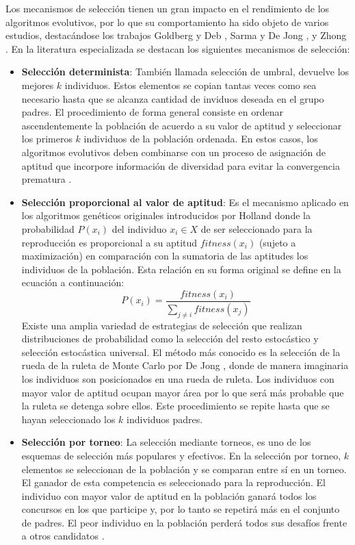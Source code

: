 Los mecanismos de selección tienen un gran impacto en el rendimiento de los algoritmos evolutivos, por lo que su comportamiento ha sido objeto de varios estudios, destacándose los trabajos Goldberg y Deb \cite{Goldberg91acomparative}, Sarma y De Jong \cite{sarma1997analysis} , y Zhong \cite{Zhong_comparisonof}. En la literatura especializada se destacan los siguientes mecanismos de selección:
\begin{itemize}
\item\textbf{Selección determinista}: También llamada selección de umbral, devuelve los mejores $k$ individuos. Estos elementos se copian tantas veces como sea necesario hasta que se alcanza cantidad de inviduos deseada  en el grupo padres. El procedimiento de forma general consiste en ordenar ascendentemente la población de acuerdo a su valor de aptitud y seleccionar los primeros $k$ individuos de la población ordenada. En estos casos, los algoritmos evolutivos deben combinarse con un proceso de asignación de aptitud que incorpore información de diversidad para evitar la convergencia prematura \cite{laessig_threshold_2008}.

\item \textbf{Selección proporcional al valor de aptitud}: Es el mecanismo aplicado en los algoritmos genéticos originales introducidos por Holland \cite{holland1992adaptation} donde la probabilidad $P (x_i)$ del individuo $x_i \in X$ de ser seleccionado para la reproducción es proporcional a su aptitud $fitness (x_i)$ (sujeto a maximización) en comparación con la sumatoria de las aptitudes los individuos de la población. Esta relación en su forma original se define en la ecuación a continuación:
\begin{equation}
   P(x_i)= \frac{fitness(x_i)}{\sum_{j\neq i}{fitness(x_j)}}
\end{equation}
Existe una amplia variedad de estrategias de selección que realizan distribuciones de probabilidad como la selección del resto estocástico y selección estocástica universal. El método más conocido es la selección de la rueda de la ruleta de Monte Carlo por De Jong \cite{de1975analysis}, donde de manera imaginaria los individuos son posicionados en una rueda de ruleta. Los individuos con mayor valor de aptitud  ocupan mayor área por lo que será más probable que la ruleta se detenga sobre ellos. Este procedimiento se repite hasta que se hayan seleccionado los $k$ individuos padres. 
\item \textbf{Selección por torneo}: La selección mediante torneos, es uno de los esquemas de selección más populares y efectivos. En la selección por torneo, $k$ elementos se seleccionan de la población y se comparan entre sí en un torneo. El ganador de esta competencia es seleccionado para la reproducción. El individuo con mayor valor de aptitud en la población ganará todos los concursos en los que participe y, por lo tanto se repetirá más en el conjunto de padres. El peor individuo en la población perderá todos sus desafíos frente a otros candidatos \cite{weise2009global}.

\end{itemize}



